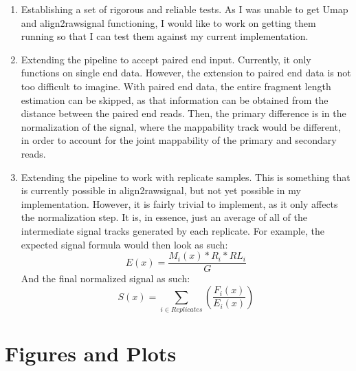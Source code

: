 \documentclass[a4paper]{article}
\begin{document}
  \begin{enumerate}
    \item Establishing a set of rigorous and reliable tests. As I was unable to get Umap and align2rawsignal functioning,
          I would like to work on getting them running so that I can test them against my current implementation.
    \item Extending the pipeline to accept paired end input. Currently, it only functions on single end data. However,
          the extension to paired end data is not too difficult to imagine. With paired end data, the entire fragment
          length estimation can be skipped, as that information can be obtained from the distance between the paired
          end reads. Then, the primary difference is in the normalization of the signal, where the mappability track
          would be different, in order to account for the joint mappability of the primary and secondary reads.
    \item Extending the pipeline to work with replicate samples. This is something that is currently possible in
          align2rawsignal, but not yet possible in my implementation. However, it is fairly trivial to implement, as it
          only affects the normalization step. It is, in essence, just an average of all of the intermediate signal
          tracks generated by each replicate. For example, the expected signal formula would then look as such:
          \begin{equation}
            \label{eq:4}
            E(x) = \frac{M_i(x)*R_i*RL_i}{G}
          \end{equation}
          And the final normalized signal as such:
          \begin{equation}
            \label{eq:5}
            S(x) = \sum_{i \in Replicates}\left(\frac{F_i(x)}{E_i(x)}\right)
          \end{equation}
  \end{enumerate}

  {}
  

  \newpage
  \section{Figures and Plots}
\end{document}
